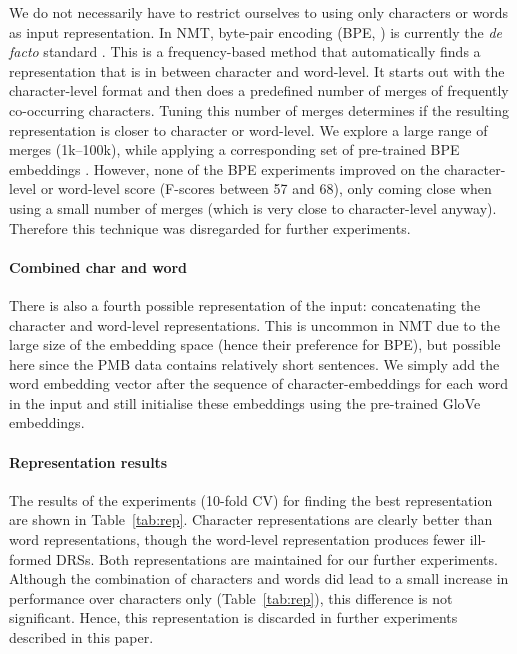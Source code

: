 \documentclass[11pt,a4paper]{article}
\begin{document}
We do not necessarily have to restrict ourselves to using only characters or words as input representation. In NMT, byte-pair encoding (BPE, \citealt{sennrich-haddow-birch:2016:P16-12}) is currently the \emph{de facto} standard \cite{bojar-EtAl:2017:WMT1}. 
This is a frequency-based method that automatically finds a representation that is in between character and word-level. 
It starts out with the character-level format and then does a predefined number of merges of frequently co-occurring characters. Tuning this number of merges determines if the resulting representation is closer to character or word-level. We explore a large range of merges (1k--100k), while applying a corresponding set of pre-trained BPE embeddings \cite{bpe_pretrain:18}. However, none of the BPE experiments improved on the character-level or word-level score (F-scores between 57 and 68), only coming close when using a small number of merges (which is very close to character-level anyway). Therefore this technique was disregarded for further experiments.			
			
\paragraph{Combined char and word}			
			
There is also a fourth possible representation of the input: concatenating the character and word-level representations. This is uncommon in NMT due to the large size of the embedding space (hence their preference for BPE), but possible here since the PMB data contains relatively short sentences. We simply add the word embedding vector after the sequence of character-embeddings for each word in the input and still initialise these embeddings using the pre-trained GloVe embeddings. 

\paragraph{Representation results}

The results of the experiments (10-fold CV) for finding the best representation are shown in Table~\ref{tab:rep}. Character representations are clearly better than word representations, though the word-level representation produces fewer ill-formed DRSs. Both representations are maintained for our further experiments. 
Although the combination of characters and words did lead to a small increase in performance over characters only (Table~\ref{tab:rep}), this difference is not significant. Hence, this representation is discarded in further experiments described in this paper.
\end{document}
